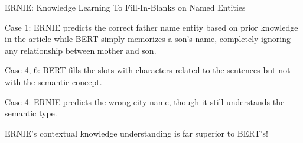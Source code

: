 \begin{frame}{ERNIE: Knowledge Learning To Fill-In-Blanks on Named Entities}
\begin{table}[htbp]
\begin{tableFont}
\begin{tabu}
        
        \hline 
    \end{tabu}
    
    \end{tableFont}
    
    \vspace{-5pt}
    
    
    \label{tbl:ernie_vs_bert_knowledgeLearningTask}
\end{table}
\vspace{-10pt}



\vspace{-10pt}
\begin{itemizeSpaced}{0pt}
    \linespread{0.1}
    \item Case 1: ERNIE predicts the correct father name entity based on prior knowledge in the article while BERT simply memorizes a son's name, completely ignoring any relationship between mother and son. 
    
    \item Case 4, 6: BERT fills the slots with characters related to the sentences but not with the semantic concept. 
    
    \item Case 4: ERNIE predicts the wrong city name, though it still understands the semantic type.
\end{itemizeSpaced}

ERNIE's contextual knowledge understanding is far superior to BERT's!
    
\end{frame}